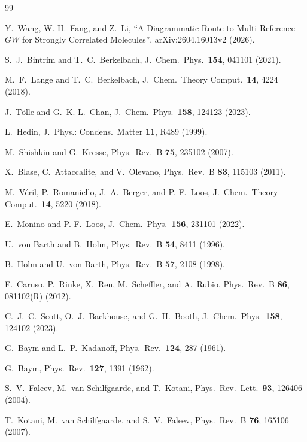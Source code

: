 \documentclass[11pt,a4paper]{article}
\begin{document}
\begin{thebibliography}{99}

Y.~Wang, W.-H.~Fang, and Z.~Li,
``A Diagrammatic Route to Multi-Reference $GW$ for Strongly Correlated Molecules'',
arXiv:2604.16013v2 (2026).

S.~J.~Bintrim and T.~C.~Berkelbach, J.~Chem.~Phys.\ \textbf{154}, 041101 (2021).

M.~F.~Lange and T.~C.~Berkelbach, J.~Chem.~Theory Comput.\ \textbf{14}, 4224 (2018).

J.~T\"olle and G.~K.-L.~Chan, J.~Chem.~Phys.\ \textbf{158}, 124123 (2023).

L.~Hedin, J.~Phys.: Condens.~Matter \textbf{11}, R489 (1999).

M.~Shishkin and G.~Kresse, Phys.~Rev.~B \textbf{75}, 235102 (2007).

X.~Blase, C.~Attaccalite, and V.~Olevano, Phys.~Rev.~B \textbf{83}, 115103 (2011).

M.~V\'eril, P.~Romaniello, J.~A.~Berger, and P.-F.~Loos,
J.~Chem.~Theory Comput.\ \textbf{14}, 5220 (2018).

E.~Monino and P.-F.~Loos, J.~Chem.~Phys.\ \textbf{156}, 231101 (2022).

U.~von Barth and B.~Holm, Phys.~Rev.~B \textbf{54}, 8411 (1996).

B.~Holm and U.~von Barth, Phys.~Rev.~B \textbf{57}, 2108 (1998).

F.~Caruso, P.~Rinke, X.~Ren, M.~Scheffler, and A.~Rubio,
Phys.~Rev.~B \textbf{86}, 081102(R) (2012).

C.~J.~C.~Scott, O.~J.~Backhouse, and G.~H.~Booth,
J.~Chem.~Phys.\ \textbf{158}, 124102 (2023).

G.~Baym and L.~P.~Kadanoff, Phys.~Rev.\ \textbf{124}, 287 (1961).

G.~Baym, Phys.~Rev.\ \textbf{127}, 1391 (1962).

S.~V.~Faleev, M.~van Schilfgaarde, and T.~Kotani,
Phys.~Rev.~Lett.\ \textbf{93}, 126406 (2004).

T.~Kotani, M.~van Schilfgaarde, and S.~V.~Faleev,
Phys.~Rev.~B \textbf{76}, 165106 (2007).


\end{thebibliography}
\end{document}
